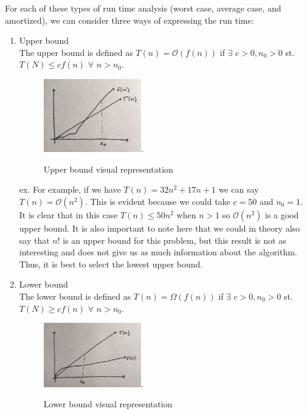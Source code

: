 For each of these types of run time analysis (worst case, average case, and amortized), we can consider three ways of expressing the run time:
\begin{enumerate}
    \item Upper bound \\
    
    The upper bound is defined as $T(n) = \mathcal{O}(f(n))$ if $\exists$  $c > 0, n_0>0$ st. $T(N) \leq cf(n)$  $\forall$  $n>n_0$. \\

\begin{figure}[h!]
  \begin{center}
    \includegraphics[width=0.4\textwidth]{figures/IMG_8828.jpg}.
    \caption{
      Upper bound visual representation}
    \label{fig:example_figure}
  \end{center}
\end{figure}
    
    ex. For example, if we have $T(n)=32n^2+17n+1$ we can say $T(n) = \mathcal{O}(n^2)$. This is evident because we could take $c=50$ and $n_0 = 1$. It is clear that in this case $T(n) \leq 50n^2$ when $n>1$ so $\mathcal{O}(n^2)$ is a good upper bound. It is also important to note here that we could in theory also say that $n!$ is an upper bound for this problem, but this result is not as interesting and does not give us as much information about the algorithm. Thus, it is best to select the lowest upper bound.
    
    \item Lower bound \\
    
    The lower bound is defined as $T(n) = \Omega(f(n))$ if $\exists$  $c > 0, n_0>0$ st. $T(N) \geq cf(n)$  $\forall$  $n>n_0$. \\
    
    \begin{figure}[h!]
  \begin{center}
    \includegraphics[width=0.4\textwidth]{figures/IMG_8827.jpg}.
    \caption{
      Lower bound visual representation}
    \label{fig:example_figure}
  \end{center}
\end{figure}
    

\end{enumerate}
